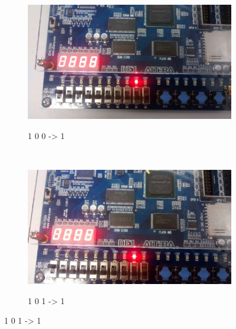 \begin{figure}
	\begin{subfigure}[b]{0.44\textwidth}
        \includegraphics[width=\textwidth]{img/cenario2/circ5}
        \label{fig:circ5}
		\caption{1 0 0 -> 1}
    \end{subfigure}
    ~
    \begin{subfigure}[b]{0.44\textwidth}
        \includegraphics[width=\textwidth]{img/cenario2/circ6}
        \label{fig:circ6}
		\caption{1 0 1 -> 1}
    \end{subfigure}


\end{figure}
